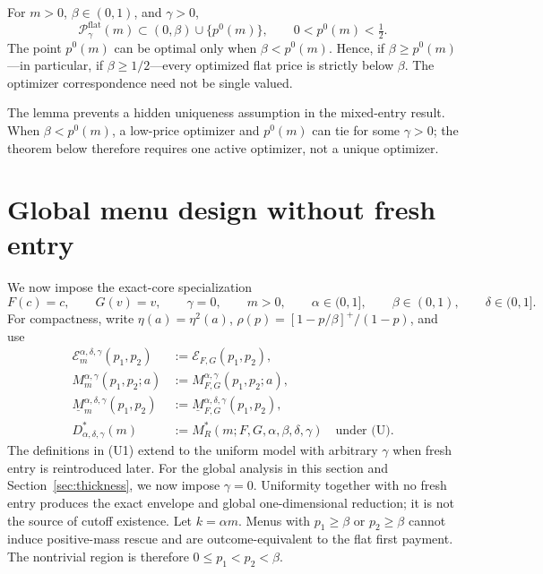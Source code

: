 \documentclass[mnsc,blindrev]{informs3}
\newcommand{\calE}{\mathcal E}
\begin{document}
\begin{lemma}
\label{lem:flatgeometry}
For \(m>0\), \(\beta\in(0,1)\), and \(\gamma>0\),
\[
 \mathcal P_\gamma^{\mathrm{flat}}(m)
 \subset(0,\beta)\cup\{p^0(m)\},\qquad
 0<p^0(m)<\tfrac12.                                      \tag{F2}
\]
The point \(p^0(m)\) can be optimal only when \(\beta<p^0(m)\).  Hence, if
\(\beta\ge p^0(m)\)---in particular, if \(\beta\ge1/2\)---every optimized
flat price is strictly below \(\beta\).  The optimizer correspondence need
not be single valued.
\end{lemma}

The lemma prevents a hidden uniqueness assumption in the mixed-entry result.
When \(\beta<p^0(m)\), a low-price optimizer and \(p^0(m)\) can tie for some
\(\gamma>0\); the theorem below therefore requires one active optimizer, not
a unique optimizer.

\section{Global menu design without fresh entry}
\label{sec:global}

We now impose the exact-core specialization
\[
 F(c)=c,\qquad G(v)=v,\qquad
 \gamma=0,\qquad m>0,\qquad \alpha\in(0,1],\qquad
 \beta\in(0,1),\qquad \delta\in(0,1].
 \tag{U}
\]
For compactness, write $\eta(a)=\eta^2(a)$,
$\rho(p)=[1-p/\beta]^+/(1-p)$, and use
\[
\begin{aligned}
 \calE_m^{\alpha,\delta,\gamma}(p_1,p_2)
 &:=\calE_{F,G}(p_1,p_2),\\
 M_m^{\alpha,\gamma}(p_1,p_2;a)
 &:=M_{F,G}^{\alpha,\gamma}(p_1,p_2;a),\\
 \underline M_m^{\alpha,\delta,\gamma}(p_1,p_2)
 &:=\underline M_{F,G}^{\alpha,\delta,\gamma}(p_1,p_2),\\
 D_{\alpha,\delta,\gamma}^*(m)
 &:=M_R^*(m;F,G,\alpha,\beta,\delta,\gamma)
 \quad\text{under (U)}.
\end{aligned}                                             \tag{U1}
\]
The definitions in (U1) extend to the uniform model with arbitrary $\gamma$
when fresh entry is reintroduced later.
For the global analysis in this section and Section~\ref{sec:thickness}, we
now impose $\gamma=0$.  Uniformity together with no fresh entry produces the
exact envelope and global one-dimensional reduction; it is not the source of
cutoff existence.
Let $k=\alpha m$.  Menus with $p_1\ge\beta$ or
$p_2\ge\beta$ cannot induce positive-mass rescue and are outcome-equivalent to
the flat first payment.  The nontrivial region is therefore
$0\le p_1<p_2<\beta$.
\end{document}
